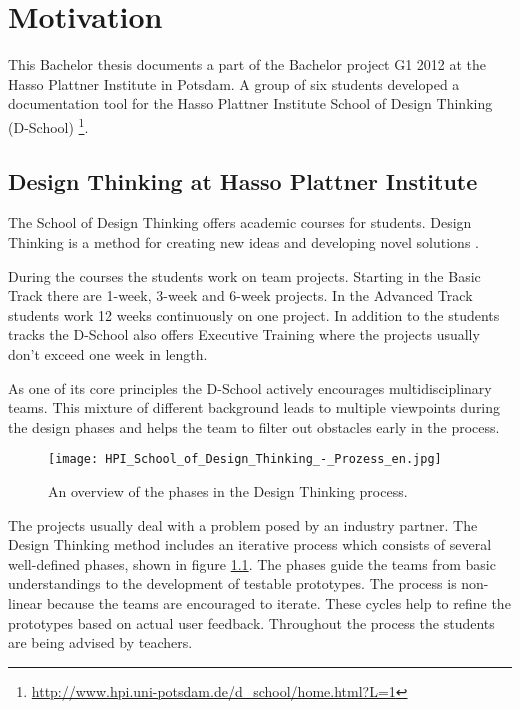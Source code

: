 \chapter{Motivation}

This Bachelor thesis documents a part of the Bachelor project G1 2012 at the Hasso Plattner Institute in Potsdam. A group of six students developed a documentation tool for the Hasso Plattner Institute School of Design Thinking (D-School) \footnote{\url{http://www.hpi.uni-potsdam.de/d_school/home.html?L=1}}. 

\section{Design Thinking at Hasso Plattner Institute}
The School of Design Thinking offers academic courses for students. Design Thinking is a method for creating new ideas and developing novel solutions \cite{Plattner_2009}. 

During the courses the students work on team projects. Starting in the Basic Track there are 1-week, 3-week and 6-week projects. In the Advanced Track students work 12 weeks continuously on one project. In addition to the students tracks the D-School also offers Executive Training where the projects usually don't exceed one week in length. 

As one of its core principles the D-School actively encourages multidisciplinary teams. This mixture of different background leads to multiple viewpoints during the design phases and helps the team to filter out obstacles early in the process. 

\begin{figure}
\texttt{[image: HPI\_School\_of\_Design\_Thinking\_-\_Prozess\_en.jpg]}
\caption[An overview of the phases in the Design Thinking process. Source: \url{http://www.hpi.uni-potsdam.de/presse/fotos/school_of_design_thinking.html}]{An overview of the phases in the Design Thinking process.}
\label{fig:DT_phases}
\end{figure}

The projects usually deal with a problem posed by an industry partner. The Design Thinking method includes an iterative process which consists of several well-defined phases, shown in figure \ref{fig:DT_phases}. The phases guide the teams from basic understandings to the development of testable prototypes. The process is non-linear because the teams are encouraged to iterate. These cycles help to refine the prototypes based on actual user feedback. Throughout the process the students are being advised by teachers.

